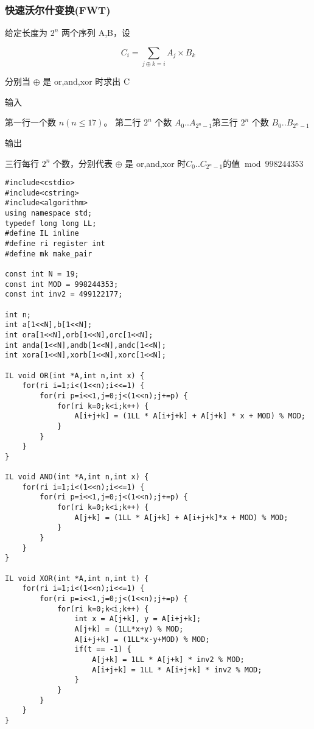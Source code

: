 \documentclass[UTF8]{ctexart}
\begin{document}
\subsubsection{快速沃尔什变换(FWT)}

给定长度为 $2^n$ 两个序列 A,B，设

$$
C_i=\sum_{j\oplus k = i}A_j \times B_k
$$

分别当 $\oplus$ 是 or,and,xor 时求出 C

输入

第一行一个数 $n(n \leq 17)$。 第二行 $2^n$ 个数 $A_0..A_{2^n-1}$​ 第三行 $2^n$ 个数 $B_0..B_{2^n-1}$​

输出

三行每行 $2^n$ 个数，分别代表 $\oplus$ 是 or,and,xor 时$C_0..C_{2^n-1}$ ​的值 $\bmod 998244353$

\begin{framed}
\begin{lstlisting}
#include<cstdio>
#include<cstring>
#include<algorithm>
using namespace std;
typedef long long LL;
#define IL inline
#define ri register int 
#define mk make_pair

const int N = 19;
const int MOD = 998244353;
const int inv2 = 499122177;

int n;
int a[1<<N],b[1<<N];
int ora[1<<N],orb[1<<N],orc[1<<N];
int anda[1<<N],andb[1<<N],andc[1<<N];
int xora[1<<N],xorb[1<<N],xorc[1<<N];

IL void OR(int *A,int n,int x) {
    for(ri i=1;i<(1<<n);i<<=1) {
        for(ri p=i<<1,j=0;j<(1<<n);j+=p) {
            for(ri k=0;k<i;k++) {
                A[i+j+k] = (1LL * A[i+j+k] + A[j+k] * x + MOD) % MOD;
            }
        }
    }
} 

IL void AND(int *A,int n,int x) {
    for(ri i=1;i<(1<<n);i<<=1) {
        for(ri p=i<<1,j=0;j<(1<<n);j+=p) {
            for(ri k=0;k<i;k++) {
                A[j+k] = (1LL * A[j+k] + A[i+j+k]*x + MOD) % MOD;
            }
        }
    }
}

IL void XOR(int *A,int n,int t) {
    for(ri i=1;i<(1<<n);i<<=1) {
        for(ri p=i<<1,j=0;j<(1<<n);j+=p) {
            for(ri k=0;k<i;k++) {
                int x = A[j+k], y = A[i+j+k];
                A[j+k] = (1LL*x+y) % MOD;
                A[i+j+k] = (1LL*x-y+MOD) % MOD;
                if(t == -1) {
                    A[j+k] = 1LL * A[j+k] * inv2 % MOD;
                    A[i+j+k] = 1LL * A[i+j+k] * inv2 % MOD;
                }
            }
        }
    }
}


\end{lstlisting}
\end{framed}
\end{document}
